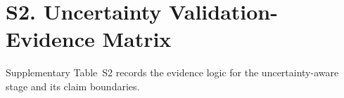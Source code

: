\section{S2. Uncertainty Validation-Evidence Matrix}

Supplementary Table~S2 records the evidence logic for the uncertainty-aware stage and its claim boundaries.



